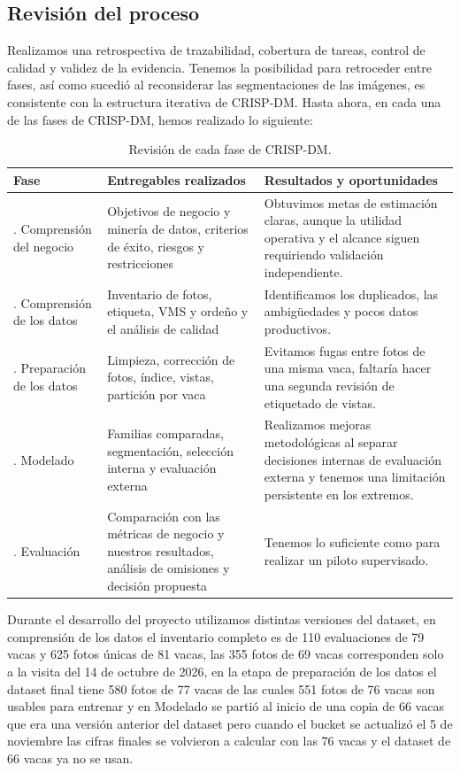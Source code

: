 \subsection{Revisión del proceso}

Realizamos una retrospectiva de trazabilidad, cobertura de tareas, control de calidad y validez de la evidencia. Tenemos la posibilidad para retroceder entre fases, así como sucedió al reconsiderar las segmentaciones de las imágenes, es consistente con la estructura iterativa de CRISP-DM. Hasta ahora, en cada una de las fases de CRISP-DM, hemos realizado lo siguiente:

\begin{table}[H]
  \centering
  \small
  \caption{Revisión de cada fase de CRISP-DM.}
  \label{tab:fases}
  \begin{tabularx}{\textwidth}{>{\raggedright\arraybackslash}p{}>{\raggedright\arraybackslash}p{}>{\raggedright\arraybackslash}X}
    \toprule
    Fase & Entregables realizados & Resultados y oportunidades \\
    \midrule
    1. Comprensión del negocio & Objetivos de negocio y minería de datos, criterios de éxito, riesgos y restricciones & Obtuvimos metas de estimación claras, aunque la utilidad operativa y el alcance siguen requiriendo validación independiente. \\
    \addlinespace
    2. Comprensión de los datos & Inventario de fotos, etiqueta, VMS y ordeño y el análisis de calidad & Identificamos los duplicados, las ambigüedades y pocos datos productivos. \\
    \addlinespace
    3. Preparación de los datos & Limpieza, corrección de fotos, índice, vistas, partición por vaca & Evitamos fugas entre fotos de una misma vaca, faltaría hacer una segunda revisión de etiquetado de vistas. \\
    \addlinespace
    4. Modelado & Familias comparadas, segmentación, selección interna y evaluación externa & Realizamos mejoras metodológicas al separar decisiones internas de evaluación externa y tenemos una limitación persistente en los extremos. \\
    \addlinespace
    5. Evaluación & Comparación con las métricas de negocio y nuestros resultados, análisis de omisiones y decisión propuesta & Tenemos lo suficiente como para realizar un piloto supervisado. \\
    \bottomrule
  \end{tabularx}
\end{table}

Durante el desarrollo del proyecto utilizamos distintas versiones del dataset, en comprensión de los datos el inventario completo es de 110 evaluaciones de 79 vacas y 625 fotos únicas de 81 vacas, las 355 fotos de 69 vacas corresponden solo a la visita del 14 de octubre de 2026, en la etapa de preparación de los datos el dataset final tiene 580 fotos de 77 vacas de las cuales 551 fotos de 76 vacas son usables para entrenar y en Modelado se partió al inicio de una copia de 66 vacas que era una versión anterior del dataset pero cuando el bucket se actualizó el 5 de noviembre las cifras finales se volvieron a calcular con las 76 vacas y el dataset de 66 vacas ya no se usan.
